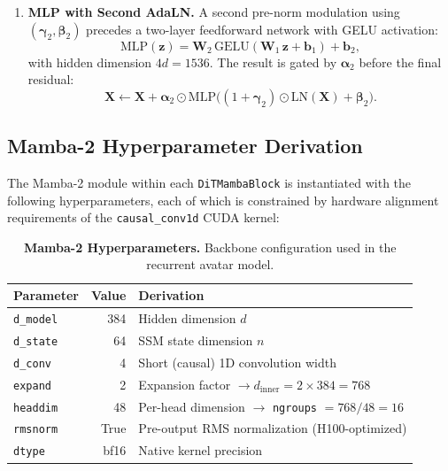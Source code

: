 \documentclass[12pt,letterpaper]{report}
\begin{document}
\begin{enumerate}
    \item \textbf{MLP with Second AdaLN.} A second pre-norm modulation using
        $(\boldsymbol{\gamma}_2, \boldsymbol{\beta}_2)$ precedes a two-layer
        feedforward network with GELU activation:
        \begin{equation}\label{eq:mlp}
            \mathrm{MLP}(\mathbf{z}) = \mathbf{W}_2\,\mathrm{GELU}(\mathbf{W}_1\,\mathbf{z} + \mathbf{b}_1) + \mathbf{b}_2,
        \end{equation}
        with hidden dimension $4d = 1536$. The result is gated by
        $\boldsymbol{\alpha}_2$ before the final residual:
        \begin{equation}\label{eq:gate2}
            \mathbf{X} \leftarrow \mathbf{X}
            + \boldsymbol{\alpha}_2 \odot \mathrm{MLP}\bigl(
                (1+\boldsymbol{\gamma}_2) \odot \mathrm{LN}(\mathbf{X})
                + \boldsymbol{\beta}_2
            \bigr).
        \end{equation}
\end{enumerate}

\subsection{Mamba-2 Hyperparameter Derivation}\label{subsec:mamba-hyperparams}

The Mamba-2 module within each \texttt{DiTMambaBlock} is instantiated with the
following hyperparameters, each of which is constrained by hardware alignment
requirements of the \texttt{causal\_conv1d} CUDA kernel: %

\begin{table}[H]
\centering
\begin{tabular}{lrl}
\toprule
\textbf{Parameter} & \textbf{Value} & \textbf{Derivation} \\
\midrule
\texttt{d\_model}    & 384  & Hidden dimension $d$ \\
\texttt{d\_state}    & 64   & SSM state dimension $n$ \\
\texttt{d\_conv}     & 4    & Short (causal) 1D convolution width \\
\texttt{expand}      & 2    & Expansion factor $\rightarrow d_{\mathrm{inner}} = 2 \times 384 = 768$ \\
\texttt{headdim}     & 48   & Per-head dimension $\rightarrow$ \texttt{ngroups} $= 768/48 = 16$ \\
\texttt{rmsnorm}     & True & Pre-output RMS normalization (H100-optimized) \\
\texttt{dtype}       & bf16 & Native kernel precision \\
\bottomrule
\end{tabular}
\caption{\textbf{Mamba-2 Hyperparameters.} Backbone configuration used in the recurrent avatar model.}
\label{tab:mamba_hyperparameters}
\end{table}
\end{document}
